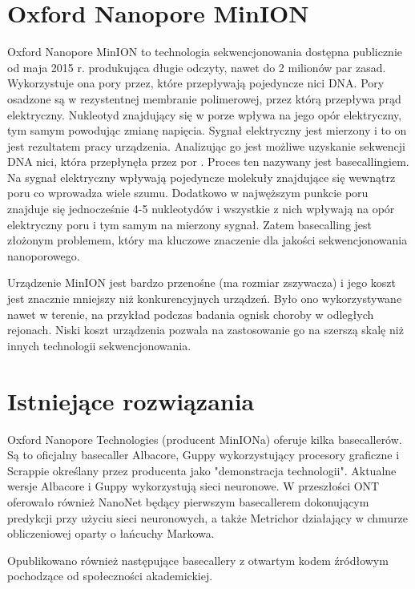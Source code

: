 \documentclass[a4paper,11pt,twoside]{report}
\theoremstyle{definition}
\begin{document}
\section{Oxford Nanopore MinION}

Oxford Nanopore MinION to technologia sekwencjonowania dostępna publicznie od maja 2015 r. produkująca długie odczyty, nawet do 2 milionów par zasad. Wykorzystuje ona pory przez, które przepływają pojedyncze nici DNA. Pory osadzone są w rezystentnej membranie polimerowej, przez którą przepływa prąd elektryczny. Nukleotyd znajdujący się w porze wpływa na jego opór elektryczny, tym samym powodując zmianę napięcia. Sygnał elektryczny jest mierzony i to on jest rezultatem pracy urządzenia. Analizując go jest możliwe uzyskanie sekwencji DNA nici, która przepłynęła przez por \cite{nanoporeHuman}. Proces ten nazywany jest basecallingiem. Na sygnał elektryczny wpływają pojedyncze molekuły znajdujące się wewnątrz poru co wprowadza wiele szumu. Dodatkowo w najwęższym punkcie poru znajduje się jednocześnie 4-5 nukleotydów i wszystkie z nich wpływają na opór elektryczny poru i tym samym na mierzony sygnał. Zatem basecalling jest złożonym problemem, który ma kluczowe znaczenie dla jakości sekwencjonowania nanoporowego.

Urządzenie MinION jest bardzo przenośne (ma rozmiar zszywacza) i jego koszt jest znacznie mniejszy niż konkurencyjnych urządzeń. Było ono wykorzystywane nawet w terenie, na przykład podczas badania ognisk choroby w odległych rejonach\cite{ebola}. Niski koszt urządzenia pozwala na zastosowanie go na szerszą skalę niż innych technologii sekwencjonowania.

\section{Istniejące rozwiązania}

Oxford Nanopore Technologies (producent MinIONa) oferuje kilka basecallerów. Są to oficjalny basecaller Albacore, Guppy wykorzystujący procesory graficzne i Scrappie określany przez producenta jako "demonstracja technologii". Aktualne wersje Albacore i Guppy wykorzystują sieci neuronowe. W przeszłości ONT oferowało również NanoNet będący pierwszym basecallerem dokonującym predykcji przy użyciu sieci neuronowych, a także Metrichor działający w chmurze obliczeniowej oparty o łańcuchy Markowa. 

Opublikowano również następujące basecallery z otwartym kodem źródłowym pochodzące od społeczności akademickiej.
\end{document}
